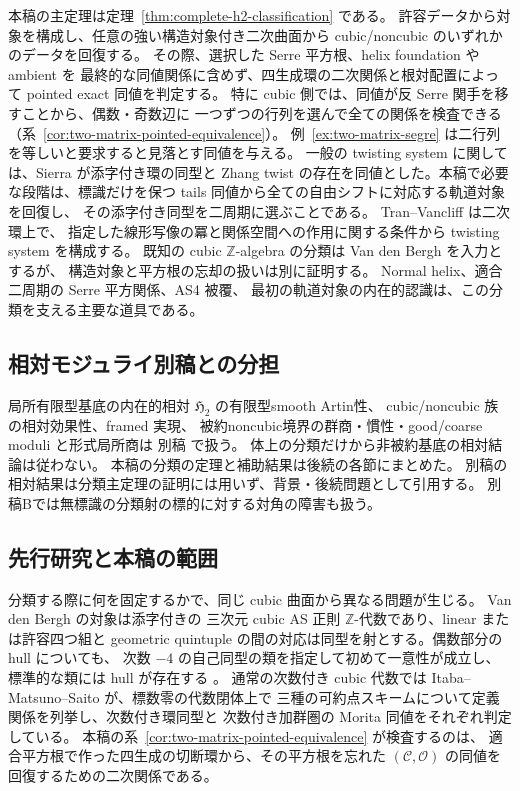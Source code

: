 \documentclass[a4paper,11pt]{ltjsarticle}
\numberwithin{equation}{section}
\theoremstyle{plain}
\theoremstyle{definition}
\theoremstyle{remark}
\newcommand{\OO}{\mathcal O}
\newcommand{\cC}{\mathcal C}
\begin{document}
本稿の主定理は定理~\ref{thm:complete-h2-classification} である。
許容データから対象を構成し、任意の強い構造対象付き二次曲面から
cubic/noncubic のいずれかのデータを回復する。
その際、選択した Serre 平方根、helix foundation や ambient を
最終的な同値関係に含めず、四生成環の二次関係と根対配置によって
pointed exact 同値を判定する。
特に cubic 側では、同値が反 Serre 関手を移すことから、偶数・奇数辺に
一つずつの行列を選んで全ての関係を検査できる
（系~\ref{cor:two-matrix-pointed-equivalence}）。
例~\ref{ex:two-matrix-segre} は二行列を等しいと要求すると見落とす同値を与える。
一般の twisting system に関しては、Sierra
\cite[Theorem 1.2, Corollary 1.3]{Sierra2011} が添字付き環の同型と
Zhang twist の存在を同値とした。本稿で必要な段階は、標識だけを保つ
tails 同値から全ての自由シフトに対応する軌道対象を回復し、
その添字付き同型を二周期に選ぶことである。
Tran--Vancliff \cite[Theorem 2.7]{TranVancliff2024} は二次環上で、
指定した線形写像の冪と関係空間への作用に関する条件から twisting system を構成する。
既知の cubic $\mathbb Z$-algebra の分類は
Van den Bergh \cite{VdB2011} を入力とするが、
構造対象と平方根の忘却の扱いは別に証明する。
Normal helix、適合二周期の Serre 平方関係、AS4 被覆、
最初の軌道対象の内在的認識は、この分類を支える主要な道具である。

\subsection{相対モジュライ別稿との分担}

局所有限型基底の内在的相対 $\mathfrak H_2$ の有限型smooth Artin性、
cubic/noncubic 族の相対効果性、framed 実現、
被約noncubic境界の群商・慣性・good/coarse moduli と形式局所商は
別稿 \cite{QuadricModuli2026} で扱う。
体上の分類だけから非被約基底の相対結論は従わない。
本稿の分類の定理と補助結果は後続の各節にまとめた。
別稿の相対結果は分類主定理の証明には用いず、背景・後続問題として引用する。
別稿Bでは無標識の分類射の標的に対する対角の障害も扱う。

\subsection{先行研究と本稿の範囲}

分類する際に何を固定するかで、同じ cubic 曲面から異なる問題が生じる。
Van den Bergh \cite[arXiv v3, Theorem 5.5.10]{VdB2011} の対象は添字付きの
三次元 cubic AS 正則 $\mathbb Z$-代数であり、linear または許容四つ組と
geometric quintuple の間の対応は同型を射とする。偶数部分の hull についても、
次数 $-4$ の自己同型の類を指定して初めて一意性が成立し、標準的な類には
hull が存在する \cite[arXiv v3, Theorem 6.1]{VdB2011}。
通常の次数付き cubic 代数では Itaba--Matsuno--Saito
\cite[Theorems 3.3, 4.2, 4.3]{IMS2025} が、標数零の代数閉体上で
三種の可約点スキームについて定義関係を列挙し、次数付き環同型と
次数付き加群圏の Morita 同値をそれぞれ判定している。
本稿の系~\ref{cor:two-matrix-pointed-equivalence} が検査するのは、
適合平方根で作った四生成の切断環から、その平方根を忘れた
$(\cC,\OO)$ の同値を回復するための二次関係である。
\end{document}
